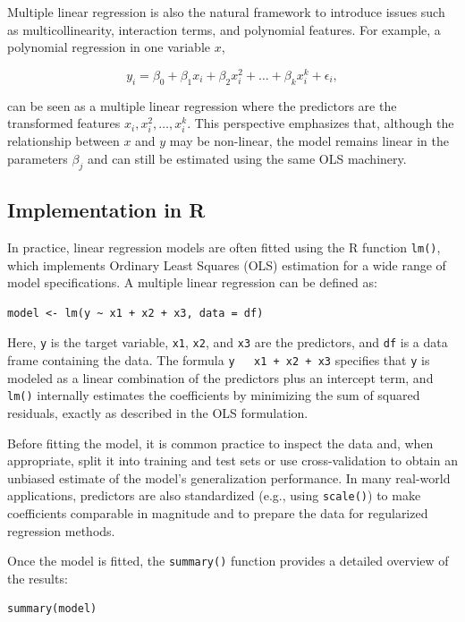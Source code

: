 Multiple linear regression is also the natural framework to introduce issues such as multicollinearity, interaction terms, and polynomial features. For example, a polynomial regression in one variable $x$,

\[
y_i = \beta_0 + \beta_1 x_i + \beta_2 x_i^2 + \dots + \beta_k x_i^k + \epsilon_i,
\]

can be seen as a multiple linear regression where the predictors are the transformed features $x_i, x_i^2, \dots, x_i^k$. This perspective emphasizes that, although the relationship between $x$ and $y$ may be non-linear, the model remains linear in the parameters $\beta_j$ and can still be estimated using the same OLS machinery.



\subsection{Implementation in R}

In practice, linear regression models are often fitted using the R function \texttt{lm()}, which implements Ordinary Least Squares (OLS) estimation for a wide range of model specifications. A multiple linear regression can be defined as:

\begin{verbatim}
model <- lm(y ~ x1 + x2 + x3, data = df)
\end{verbatim}

Here, \texttt{y} is the target variable, \texttt{x1}, \texttt{x2}, and \texttt{x3} are the predictors, and \texttt{df} is a data frame containing the data. The formula \texttt{y ~ x1 + x2 + x3} specifies that \texttt{y} is modeled as a linear combination of the predictors plus an intercept term, and \texttt{lm()} internally estimates the coefficients by minimizing the sum of squared residuals, exactly as described in the OLS formulation.

Before fitting the model, it is common practice to inspect the data and, when appropriate, split it into training and test sets or use cross-validation to obtain an unbiased estimate of the model’s generalization performance. In many real-world applications, predictors are also standardized (e.g., using \texttt{scale()}) to make coefficients comparable in magnitude and to prepare the data for regularized regression methods.

Once the model is fitted, the \texttt{summary()} function provides a detailed overview of the results:

\begin{verbatim}
summary(model)
\end{verbatim}

